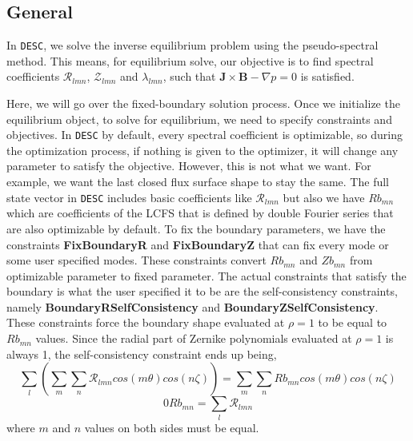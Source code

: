 \subsection{General}

In \texttt{DESC}, we solve the inverse equilibrium problem using the pseudo-spectral method. This means, for equilibrium solve, our objective is to find spectral coefficients $\mathcal{R}_{lmn}$, $\mathcal{Z}_{lmn}$ and $\mathcal{\lambda}_{lmn}$, such that $\mathbf{J}\times\mathbf{B}-\nabla p = 0$ is satisfied.

Here, we will go over the fixed-boundary solution process. Once we initialize the equilibrium object, to solve for equilibrium, we need to specify constraints and objectives. In \texttt{DESC} by default, every spectral coefficient is optimizable, so during the optimization process, if nothing is given to the optimizer, it will change any parameter to satisfy the objective. However, this is not what we want. For example, we want the last closed flux surface shape to stay the same. The full state vector in \texttt{DESC} includes basic coefficients like $\mathcal{R}_{lmn}$ but also we have $\textit{Rb}_{mn}$ which are coefficients of the LCFS that is defined by double Fourier series that are also optimizable by default. To fix the boundary parameters, we have the constraints \textbf{FixBoundaryR} and \textbf{FixBoundaryZ} that can fix every mode or some user specified modes. These constraints convert $\textit{Rb}_{mn}$ and $\textit{Zb}_{mn}$ from optimizable parameter to fixed parameter. The actual constraints that satisfy the boundary is what the user specified it to be are the self-consistency constraints, namely \textbf{BoundaryRSelfConsistency} and \textbf{BoundaryZSelfConsistency}. These constraints force the boundary shape evaluated at $\rho=1$ to be equal to $\textit{Rb}_{mn}$ values. Since the radial part of Zernike polynomials evaluated at $\rho=1$ is always 1, the self-consistency constraint ends up being,
\begin{equation*}
    \sum_{l}\left( \sum_{m}\sum_{n}\mathcal{R}_{lmn}cos(m\theta)cos(n\zeta)\right)
    = \sum_{m}\sum_{n}\textit{Rb}_{mn}cos(m\theta)cos(n\zeta)
\end{equation*}
\begin{equation*}
0    \textit{Rb}_{mn} = \sum_{l}\mathcal{R}_{lmn}
\end{equation*}
where $m$ and $n$ values on both sides must be equal.

